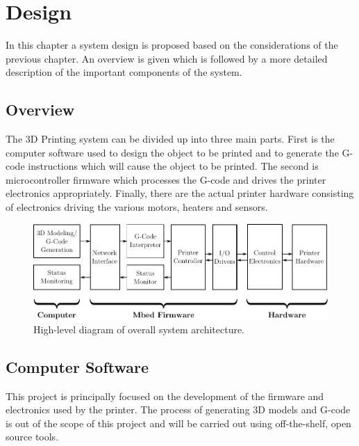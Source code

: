 \chapter{Design}
	
	
	In this chapter a system design is proposed based on the considerations of the
	previous chapter. An overview is given which is followed by a more detailed
	description of the important components of the system.
	
	\section{Overview}
		
		The 3D Printing system can be divided up into three main parts. First is the
		computer software used to design the object to be printed and to generate
		the G-code instructions which will cause the object to be printed. The
		second is microcontroller firmware which processes the G-code and drives the
		printer electronics appropriately. Finally, there are the actual printer
		hardware consisting of electronics driving the various motors, heaters and
		sensors.
		
		\begin{figure}[here]
			\includegraphics[width=1\textwidth]{diagrams/systemDiagramTop.pdf}
			\caption{High-level diagram of overall system architecture.}
			\label{fig:systemDiagramTop}
		\end{figure}
	
	\section{Computer Software}
		
		This project is principally focused on the development of the firmware and
		electronics used by the printer. The process of generating 3D models and
		G-code is out of the scope of this project and will be carried out using
		off-the-shelf, open source tools.
		
